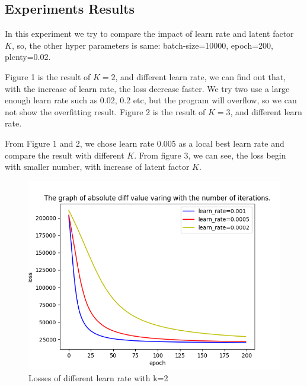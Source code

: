 \documentclass[journal, a4paper]{IEEEtran}
\begin{document}
\subsection{Experiments Results}
In this experiment we try to compare the impact of learn rate and latent factor $K$, so, the other hyper parameters is same: batch-size=10000, epoch=200, plenty=0.02.

Figure 1 is the result of $K=2$, and different learn rate, we can find out that, with the increase of learn rate, the loss decrease faster. We try two use a large enough learn rate such as 0.02, 0.2 etc, but the program will overflow, so we can not show the overfitting result. 
Figure 2 is the result of $K=3$, and different learn rate.

From Figure 1 and 2, we chose learn rate 0.005 as a local best learn rate and compare the result with different $K$. From figure 3, we can see, the loss begin with smaller number, with increase of latent factor $K$.
\begin{figure}[!htb]
	\begin{center}
	\includegraphics[width=\columnwidth]{mf_k2}
	\caption{Losses of different learn rate with k=2}
	\label{fig:mf_k2}
	\end{center}
\end{figure}
\end{document}
